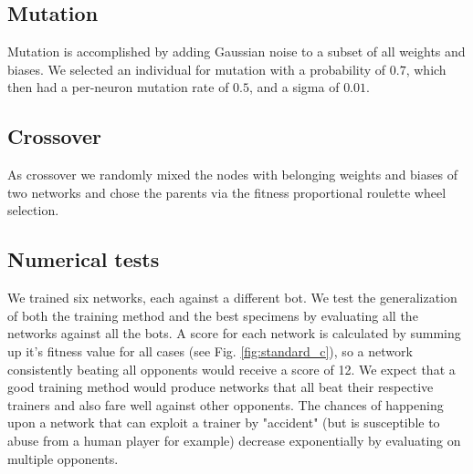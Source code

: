 \documentclass[11pt,a4paper]{scrartcl}
\begin{document}
\subsection{Mutation}
Mutation is accomplished by adding Gaussian noise to a subset of all weights and biases. We selected an individual for mutation with a probability of $0.7$, which then had a per-neuron mutation rate of $0.5$, and a sigma of $0.01$.

\subsection{Crossover}
As crossover we randomly mixed the nodes with belonging weights and biases of two networks and chose the parents via the fitness proportional roulette wheel selection.


\subsection{Numerical tests}
We trained six networks, each against a different bot. We test the generalization of both the training method and the best specimens by evaluating all the networks against all the bots. A score for each network is calculated by summing up it's fitness value for all cases (see Fig. \ref{fig:standard_c}), so a network consistently beating all opponents would receive a score of 12. We expect that a good training method would produce networks that all beat their respective trainers and also fare well against other opponents. The chances of happening upon a network that can exploit a trainer by "accident" (but is susceptible to abuse from a human player for example) decrease exponentially by evaluating on multiple opponents.
\end{document}
